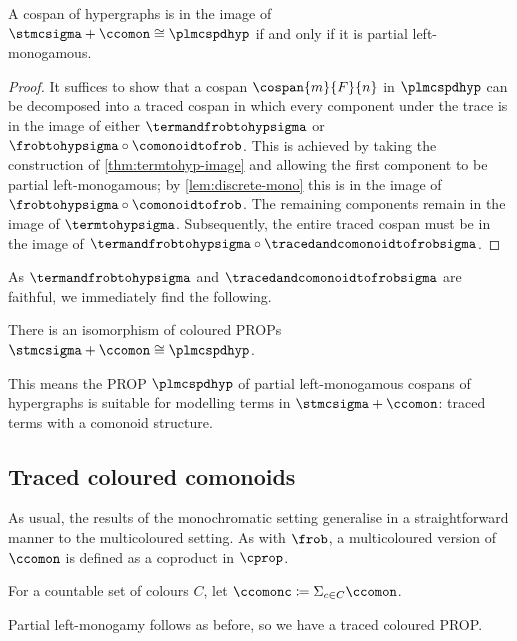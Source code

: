 \begin{theorem}\label{thm:comonoid-fully-complete}
    A cospan of hypergraphs is in the image of
    \(\stmcsigma + \ccomon \cong \plmcspdhyp\) if and only if it is partial
    left-monogamous.
\end{theorem}
\begin{proof}
    It suffices to show that a cospan \(\cospan{m}{F}{n}\) in
    \(\plmcspdhyp\) can be decomposed into a traced cospan in which every
    component under the trace is in the image of either
    \(\termandfrobtohypsigma\) or \(\frobtohypsigma \circ \comonoidtofrob\).
    This is achieved by taking the construction of \cref{thm:termtohyp-image}
    and allowing the first component to be partial left-monogamous; by
    \cref{lem:discrete-mono} this is in the image of
    \(\frobtohypsigma \circ \comonoidtofrob\).
    The remaining components remain in the image of \(\termtohypsigma\).
    Subsequently, the entire traced cospan must be in the image of \(
    \termandfrobtohypsigma \circ \tracedandcomonoidtofrobsigma
    \).
\end{proof}

As \(\termandfrobtohypsigma\) and \(\tracedandcomonoidtofrobsigma\) are
faithful, we immediately find the following.

\begin{corollary}
    There is an isomorphism of coloured PROPs
    \(\stmcsigma + \ccomon \cong \plmcspdhyp\).
\end{corollary}

This means the PROP \(\plmcspdhyp\) of partial left-monogamous cospans of
hypergraphs is suitable for modelling terms in \(\stmcsigma + \ccomon\):
traced terms with a comonoid structure.

\subsection{Traced coloured comonoids}

As usual, the results of the monochromatic setting generalise in a
straightforward manner to the multicoloured setting.
As with \(\frob\), a multicoloured version of \(\ccomon\) is defined as a
coproduct in \(\cprop\).

\begin{definition}
    For a countable set of colours \(C\), let
    \(\ccomonc \coloneqq \Sigma_{c \in C} \ccomon\).
\end{definition}

Partial left-monogamy follows as before, so we have a traced coloured PROP.

